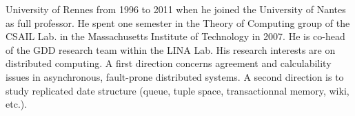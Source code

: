 University of Rennes from 1996 to 2011 when he joined the University of Nantes
as full professor. He spent one semester in the Theory of Computing group of the
CSAIL Lab. in the Massachusetts Institute of Technology in 2007. 
He is co-head of the GDD research team within the LINA Lab.  His research
interests are on distributed computing. A first direction concerns agreement and
calculability issues in asynchronous, fault-prone distributed systems.
A second direction is to study replicated date structure (queue, tuple space,
transactionnal memory, wiki, etc.).

